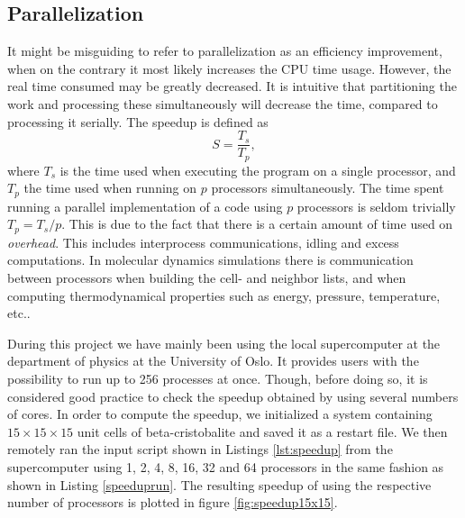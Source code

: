\documentclass[twoside,english]{uiofysmaster}
\begin{document}
\subsection{Parallelization}
It might be misguiding to refer to parallelization as an efficiency improvement, when on the contrary it most likely increases the CPU time usage. 
However, the real time consumed may be greatly decreased. 
It is intuitive that partitioning the work and processing these simultaneously will decrease the time, compared to processing it serially.   
The speedup is defined as 
\begin{equation}
S = \frac{T_s}{T_p},
\end{equation}
where $T_s$ is the time used when executing the program on a single processor, and $T_p$ the time used when running on $p$ processors simultaneously.
The time spent running a parallel implementation of a code using $p$ processors is seldom trivially $T_p=T_s/p$. This is due to the fact that there is a certain amount of time used on \textit{overhead}. This includes interprocess communications, idling and excess computations.
In molecular dynamics simulations there is communication between processors when building the cell- and neighbor lists, and when computing thermodynamical properties such as energy, pressure, temperature, etc.. 

During this project we have mainly been using the local supercomputer at the department of physics at the University of Oslo. It provides users with the possibility to run  up to 256 processes at once. Though, before doing so, it is considered good practice to check the speedup obtained by using several numbers of cores.
In order to compute the speedup, we initialized a system containing $15\times15\times15$ unit cells of beta-cristobalite and saved it as a restart file. 
We then remotely ran the input script shown in Listings \ref{lst:speedup} from the supercomputer using 1, 2, 4, 8, 16, 32 and 64 processors in the same fashion as shown in Listing \ref{speeduprun}.  
The resulting speedup of using the respective number of processors is plotted in figure \ref{fig:speedup15x15}.


\end{document}
